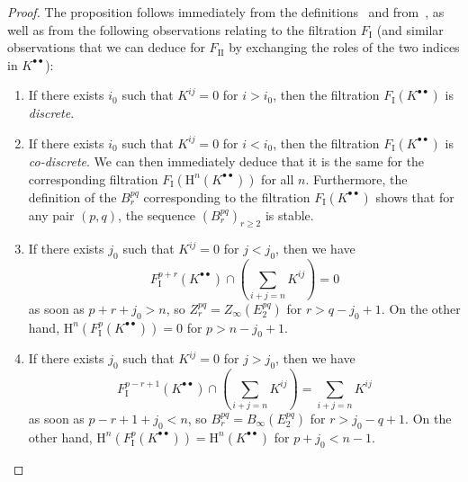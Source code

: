 \documentclass[oneside]{amsart}
\theoremstyle{ega-env-style}
\theoremstyle{ega-thm-env-style}
\theoremstyle{ega-defn-env-style}
\def\geq{\geqslant}                 %
\def\HH{\mathrm{H}}                 %
\newcommand{\oldpage}[2][]{{\marginnote{\normalfont{\textbf{#1}~|~#2}}}\ignorespaces}
\begin{document}
\begin{proof}
The proposition follows immediately from the definitions~ and from~, as well as from the following observations relating to the filtration $F_\mathrm{I}$ (and similar observations that we can deduce for $F_\mathrm{II}$ by exchanging the roles of the two indices in $K^{\bullet\bullet}$):
\begin{enumerate}
  \item[{$1^{\circ}$}] If there exists $i_0$ such that $K^{ij}=0$ for $i>i_0$, then the filtration $F_\mathrm{I}(K^{\bullet\bullet})$ is \emph{discrete}.
  \item[{$2^{\circ}$}] If there exists $i_0$ such that $K^{ij}=0$ for $i<i_0$, then the filtration $F_\mathrm{I}(K^{\bullet\bullet})$ is \emph{co-discrete}.
    We can then immediately deduce that it is the same for the corresponding filtration $F_\mathrm{I}(\HH^n(K^{\bullet\bullet}))$ for all $n$.
    Furthermore, the definition of the $B_{r}^{pq}$ corresponding to the filtration $F_\mathrm{I}(K^{\bullet\bullet})$  shows that for any pair $(p,q)$, the sequence $(B_{r}^{pq})_{r\geq 2}$ is stable.
  \item[{$3^{\circ}$}] If there exists $j_0$ such that $K^{ij}=0$ for $j<j_0$, then we have 
    \[
      F_\mathrm{I}^{p+r}(K^{\bullet\bullet})
      \cap (\sum_{i+j=n}K^{ij})
      = 0
    \]
    as soon as $p+r+j_{0}>n$, so $Z_{r}^{pq} = Z_\infty(E_2^{pq})$ for $r>q-j_{0}+1$.
    On the other hand, $\HH^{n}(F_\mathrm{I}^{p}(K^{\bullet\bullet})) = 0$ for $p>n-j_{0}+1$.
  \item[{$4^{\circ}$}] If there exists $j_0$ such that $K^{ij}=0$ for $j>j_0$, then we have 
    \[
      F_\mathrm{I}^{p-r+1}(K^{\bullet\bullet})
      \cap (\sum_{i+j=n}K^{ij})
      = \sum_{i+j=n}K^{ij}
    \]
    \oldpage[0\textsubscript{III}]{31}
    as soon as $p-r+1+j_{0}<n$, so $B_{r}^{pq} = B_\infty(E_2^{pq})$ for $r>j_{0}-q+1$.
    On the other hand, $\HH^{n}(F_\mathrm{I}^{p}(K^{\bullet\bullet})) = \HH^{n}(K^{\bullet\bullet})$ for $p+j_{0}<n-1$.
\end{enumerate}
\end{proof}
\end{document}
